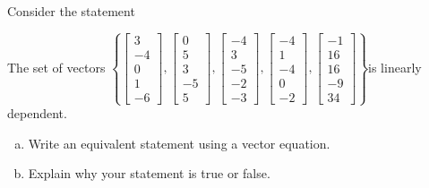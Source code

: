 
\begin{exerciseStatement}


Consider the statement 
\begin{center}\begin{minipage}{0.8\textwidth}
 The set of vectors \( \left\{ \left[\begin{array}{c}
3 \\
-4 \\
0 \\
1 \\
-6
\end{array}\right] , \left[\begin{array}{c}
0 \\
5 \\
3 \\
-5 \\
5
\end{array}\right] , \left[\begin{array}{c}
-4 \\
3 \\
-5 \\
-2 \\
-3
\end{array}\right] , \left[\begin{array}{c}
-4 \\
1 \\
-4 \\
0 \\
-2
\end{array}\right] , \left[\begin{array}{c}
-1 \\
16 \\
16 \\
-9 \\
34
\end{array}\right] \right\} \)is linearly dependent.
\end{minipage}\end{center}
    


\begin{enumerate}[(a)]
\item  Write an equivalent statement using a vector equation.
\item  Explain why your statement is true or false.
\end{enumerate}
    
\end{exerciseStatement}
    
